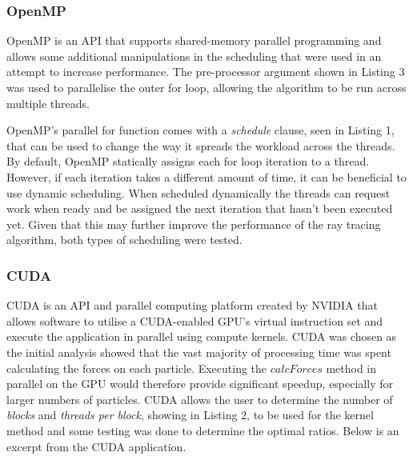 \documentclass[12pt,journal,transmag]{IEEEtran}
\begin{document}
	\subsubsection{OpenMP}
	OpenMP is an API that supports shared-memory parallel programming and allows some additional manipulations in the scheduling that were used in an attempt to increase performance. The pre-processor argument shown in Listing 3 was used to parallelise the outer for loop, allowing the algorithm to be run across multiple threads.
	
	
	
	OpenMP's parallel for function comes with a \textit{schedule} clause, seen in Listing 1, that can be used to change the way it spreads the workload across the threads. By default, OpenMP statically assigns each for loop iteration to a thread. However, if each iteration takes a different amount of time, it can be beneficial to use dynamic scheduling. When scheduled dynamically the threads can request work when ready and be assigned the next iteration that hasn't been executed yet. Given that this may further improve the performance of the ray tracing algorithm, both types of scheduling were tested.
	
	\subsubsection{CUDA}
	CUDA is an API and parallel computing platform created by NVIDIA that allows software to utilise a CUDA-enabled GPU's virtual instruction set and execute the application in parallel using compute kernels. CUDA was chosen as the initial analysis showed that the vast majority of processing time was spent calculating the forces on each particle. Executing the $calcForces$ method in parallel on the GPU would therefore provide significant speedup, especially for larger numbers of particles. CUDA allows the user to determine the number of \textit{blocks} and \textit{threads per block}, showing in Listing 2, to be used for the kernel method and some testing was done to determine the optimal ratios. Below is an excerpt from the CUDA application.
	
	
	
\end{document}
